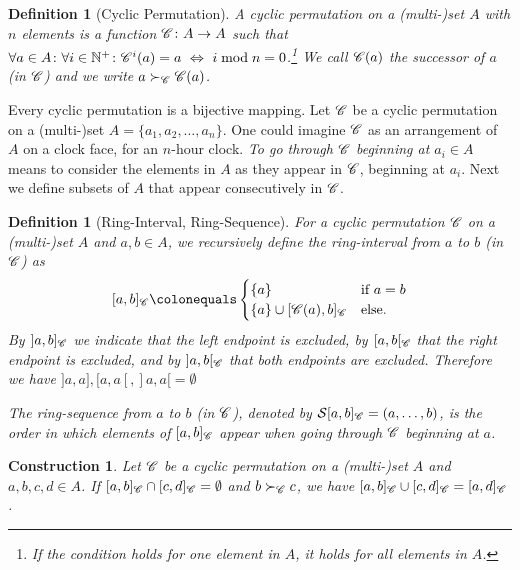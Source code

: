 \documentclass[10pt]{article}
\newtheorem{definition}[theorem]{Definition}
\newtheorem{construction}[theorem]{Construction}
\newcommand{\cordered}{\fu{S}}\newcommand{\lvi}[2]{\lv{}^{#2}(#1)}\newcommand{\rvi}[2]{\rv{}^{#2}(#1)}\newcommand{\lvd}[1]{\fu{L}_v(#1)}\newcommand{\rvd}[1]{\fu{R}_v(#1)}
\begin{document}
\begin{definition}[Cyclic Permutation]
A \emph{cyclic permutation} on a (multi-)set $A$ with $n$ elements is a function
$\mathscr{C}\colon A\rightarrow A$
such that  
$\forall a\in A\colon\forall i\in\mathbb{N}^+\colon\mathscr{C}^i(a)= a ~\Leftrightarrow~ i\bmod n=0$.\footnote{If 
the condition holds for one element in $A$, it holds for all elements in $A$.}
We call $\mathscr{C}(a)$ the \emph{successor of $a$ (in $\mathscr{C}$)} and we write
$a\succ_{\mathscr{C}} \mathscr{C}(a)$.
\end{definition}

Every cyclic permutation is a bijective mapping.
Let $\mathscr{C}$ be a cyclic permutation on a (multi-)set $A=\{a_1,a_2,\ldots,a_n\}$.
One could imagine $\mathscr{C}$ as an arrangement of $A$ on a clock face, for an $n$-hour clock.
\emph{To go through $\mathscr{C}$ beginning at $a_i\in A$} means to consider the elements in 
$A$ as they appear in $\mathscr{C}$, beginning at $a_i$. Next we define subsets of $A$ that appear 
consecutively in $\mathscr{C}$.


\begin{definition}[Ring-Interval, Ring-Sequence]\label{interval}
For a cyclic permutation $\mathscr{C}$ on a (multi-)set $A$ and $a,b\in A$, we recursively define 
the \emph{ring-interval from $a$ to $b$ (in $\mathscr{C}$)} as
$$[a,b]_\ri{C}\colonequals 
\begin{cases}
\{a\}&\text{if }a=b\\
\{a\}\cup[\ri{C}(a),b]_\ri{C}&\text{else.}\\
\end{cases}
$$
By $]a,b]_{\mathscr{C}}$ we indicate that the left endpoint is excluded, by  $[a,b[_{\mathscr{C}}$ that the right endpoint is
excluded, and by $]a,b[_{\mathscr{C}}$ that both endpoints  are excluded.
Therefore we have $]a,a],[a,a[,]a,a[=\emptyset$

The \emph{ring-sequence from $a$ to $b$ (in $\mathscr{C}$)}, denoted by 
$\cordered[a,b]_\ri{C}=(a,\ldots,b)$, is the order in which elements of $[a,b]_{\mathscr{C}}$ appear when going through $\mathscr{C}$ beginning at $a$.






\end{definition}



\begin{construction}\label{ringkombi}
Let $\mathscr{C}$ be a cyclic permutation on a (multi-)set $A$ and $a,b,c,d\in A$.
If $[a,b]_{\mathscr{C}}\cap[c,d]_{\mathscr{C}}=\emptyset$ and $b\succ_{\mathscr{C}}c$, we 
have $[a,b]_{\mathscr{C}}\cup[c,d]_{\mathscr{C}}=[a,d]_{\mathscr{C}}$.
\end{construction}
\end{document}
